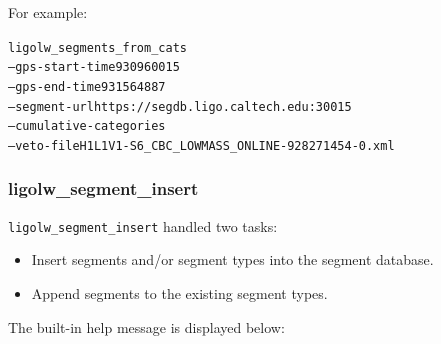 For example:
\begin{alltt}
ligolw\_segments\_from\_cats
  --gps-start-time 930960015
  --gps-end-time 931564887
  --segment-url https://segdb.ligo.caltech.edu:30015
  --cumulative-categories
  --veto-file H1L1V1-S6\_CBC\_LOWMASS\_ONLINE-928271454-0.xml
\end{alltt}




\subsubsection{ligolw\_segment\_insert}

\texttt{ligolw\_segment\_insert} handled two tasks:
%
\begin{itemize}
\item Insert segments and/or segment types into the segment database.
\item Append segments to the existing segment types.
\end{itemize}
%
The built-in help message is displayed below:
%
